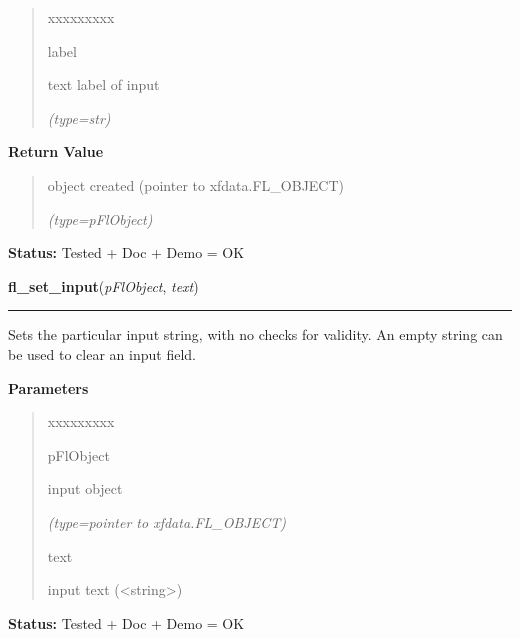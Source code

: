 \begin{boxedminipage}{\funcwidth}
\begin{quote}
\begin{Ventry}{xxxxxxxxx}
          \item[label]

          text label of input

            {\it (type=str)}

        \end{Ventry}

      \end{quote}

      \textbf{Return Value}
    \vspace{-1ex}

      \begin{quote}
      object created (pointer to xfdata.FL\_OBJECT)

      {\it (type=pFlObject)}

      \end{quote}

\textbf{Status:} Tested + Doc + Demo = OK



    \end{boxedminipage}

    \label{xformslib:flinput:fl_set_input}

    \vspace{0.5ex}

\hspace{.8\funcindent}\begin{boxedminipage}{\funcwidth}

    \raggedright \textbf{fl\_set\_input}(\textit{pFlObject}, \textit{text})

    \vspace{-1.5ex}

    \rule{\textwidth}{0.5\fboxrule}
\setlength{\parskip}{2ex}
    Sets the particular input string, with no checks for validity. An empty
    string can be used to clear an input field.

\setlength{\parskip}{1ex}
      \textbf{Parameters}
      \vspace{-1ex}

      \begin{quote}
        \begin{Ventry}{xxxxxxxxx}

          \item[pFlObject]

          input object

            {\it (type=pointer to xfdata.FL\_OBJECT)}

          \item[text]

          input text ({\textless}string{\textgreater})

        \end{Ventry}

      \end{quote}

\textbf{Status:} Tested + Doc + Demo = OK



    \end{boxedminipage}

